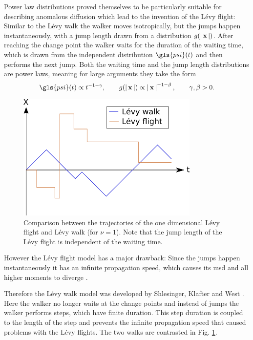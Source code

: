 Power law distributions proved themselves to be particularly suitable for describing anomalous diffusion which lead to the invention of the L\'evy flight: Similar to the L\'evy walk the walker moves isotropically, but the jumps happen instantaneously, with a jump length drawn from a distribution $g(\left|\,\mathbf{ x }\,\right|)$. After reaching the change point the walker waits for the duration of the waiting time, which is drawn from the independent distribution $\gls{psi}(t)$ and then performs the next jump. Both the waiting time and the jump length distributions are power laws, meaning for large arguments they take the form 
%
\begin{align}
\gls{psi}(t) \propto t^{-1-\gamma}, \qquad g(\abs{\ve{x}}) \propto \abs{\ve{x}}^{-1-\beta}, \qquad \gamma, \beta > 0.
\end{align} 
%
\begin{figure}
\begin{center}
\includegraphics[width=90mm]{pics/levyFlight.png}
\caption{Comparison between the trajectories of the one dimensional L\'evy flight and L\'evy walk (for $\nu=1$). Note that the jump length of the L\'evy flight is independent of the waiting time.
\label{fig:levyFlight}}
\end{center}
\end{figure}
%
However the L\'evy flight model has a major drawback: Since the jumps happen instantaneously it has an infinite propagation speed, which causes its \gls{msd} and all higher moments to diverge 
\cite{lwreview}. 

Therefore the L\'evy walk model was developed by Shlesinger, Klafter and West
\cite{shlesinger1987}. 
Here the walker no longer waits at the change points and instead of jumps the walker performs steps, which have finite duration. This step duration is coupled to the length of the step and prevents the infinite propagation speed that caused problems with the L\'evy flights. The two walks are contrasted in Fig. \ref{fig:levyFlight}. 

